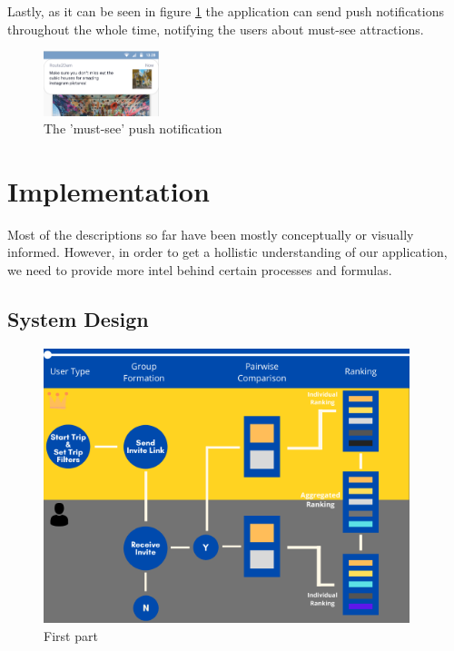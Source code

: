 \documentclass[11pt,a4paper,oneside]{article}
\begin{document}
Lastly, as it can be seen in figure \ref{fig:must_see} the application can send push notifications throughout the whole time, notifying the users about must-see attractions.

\begin{figure}[H]
    \centering
    \includegraphics[width=0.3\textwidth]{paper/imgs/hifi_prototypes/push_notification_must_see.png}
    \caption{The 'must-see' push notification}
    \label{fig:must_see}
\end{figure}

\section{Implementation}
Most of the descriptions so far have been mostly conceptually or visually informed. However, in order to get a hollistic understanding of our application, we need to provide more intel behind certain processes and formulas.

\subsection{System Design}

\begin{figure}[H]
    \centering
    \includegraphics[width=0.95\textwidth]{paper/imgs/flowchart/1.png}
    \caption{First part}
    \label{fig:flowchart1}
\end{figure}
\end{document}
